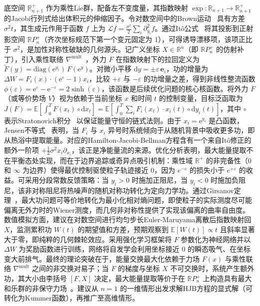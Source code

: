 ﻿\documentclass[10pt,a4paper]{article}
\begin{document}
\begin{framed}
  
底空间 $\mathbb R^+_{n+1}$ 作为乘性Lie群，配备左不变度量，其指数映射 $\exp: \mathbb R_{n+1} \to \mathbb R^+_{n+1}$ 的Jacobi行列式给出体积元的伸缩因子。令对数空间中的Brown运动~\cite{Nelson1967Dynamical} 具有方差 $\sigma^2 t$，其生成元作用于函数 $f$ 上为 $\mathcal L f = \frac{\sigma^2}{2} \sum_i \partial_{y_i}^2 f$。通过It\^o公式~\cite{ItO1951Stochastic,Protter2005Stochastic} 将其投影到正射影空间 $\mathbb R P^+_n$（齐次坐标规范下第一个变元固定为 $1$），可得诱导漂移项，该项正比于 $\sigma^2$，是加性对称性破缺的几何源头。记广义坐标 $X \in \mathbb R^n$（即 $\mathbb R P^+_n$ 的仿射补丁），引入乘性联络 $\nabla^{\mathrm{mult}}$~\cite{KobayashiNomizu1963Foundations}，外力 $F$ 在指数映射下的拉回定义为 $\tilde F(y) = \mathrm{diag}(\mathrm e^{y_i}) \, F(\mathrm e^y)$。对微小平移 $\mathrm dy = \pm\varepsilon \, \mathbf e_i$，功的增量为 $\Delta W = F_i(x) \cdot (\mathrm e^{\varepsilon} - 1) x_i$，比较 $+\varepsilon$ 与 $-\varepsilon$ 的功增量之差，得到非线性整流函数 $\phi(\varepsilon) = \mathrm e^{\varepsilon} - \mathrm e^{-\varepsilon} = 2\sinh(\varepsilon)$，该函数是后续优化问题的核心核函数。将外力 $F$（或等价势场 $V$）视为依赖于当前坐标 $x$ 和时间 $t$ 的控制变量，目标泛函取为 $J(F) = \mathbb E\left[\int_0^T F(x_t)\circ \mathrm dx_t\right] = \mathbb E\left[\int_0^T \sum_i F_i(x_t)\cdot x_i(t)\circ \mathrm dy_i(t)\right]$，其中 $\circ$ 表示Stratonovich积分~\cite{Stratonovich1966New} 以保证能量守恒的链式法则。由于 $x_i = \mathrm e^{y_i}$ 是凸函数，Jensen不等式~\cite{Jensen1906SurLesFonctions} 表明，当 $F_i$ 与 $x_i$ 异号时系统倾向于从随机背景中吸收更多功，即从热浴中提取能量。对应的Hamilton-Jacobi-Bellman方程含有一个来自It\^o修正的额外一阶项 $+\frac12\sigma^2 x_i \partial_{x_i}$，该正是净能量流的来源。优化分析表明，最大能量提取不在平衡态处实现，而在于边界追踪或奇异点吸引机制：乘性域 $\mathbb R^+$ 的非完备性（$0$ 和 $\infty$ 为边界）使得最优控制驱使粒子轨迹接近 $0$，因为 $e^{-\varepsilon}$ 的损失小于 $e^{+\varepsilon}$ 的收益。可采用分段常数反馈策略：当 $y_i > 0$ 时施加正阻尼，当 $y_i < 0$ 时施加负阻尼，该非对称阻尼将热噪声的随机对称功转化为定向力学功。通过Girsanov定理~\cite{Bismut1981LargeDeviations}，最大功问题可等价地转化为最小化相对熵问题，即使粒子的实际测度尽可能偏离无外力时的Wiener测度，而几何非对称性提供了实现该偏离的曲率自由度。数值模拟方面，建议在对数空间进行均匀步长Euler-Maruyama离散后指数映射回 $X$，监测累积功 $W(t)$ 的期望值和方差，预期观察到 $\mathbb E[W(t)] \propto t$ 且斜率显著大于零，即纯粹的几何棘轮效应。采用强化学习框架将 $F$ 参数化为神经网络并以 $\Delta W$ 为奖励函数进行训练，网络将自发学会利用坐标接近 $0$ 的瞬态吸气、在坐标变大前排气。最终的理论突破在于，能量交换最大化依赖于力场 $F(x)$ 与乘性联络 $\nabla^{\mathrm{mult}}$ 之间的非交换对易子；当 $F$ 的梯度与坐标 $X$ 不可交换时，系统产生额外功，其大小由李括号 $[F, X]$ 决定，最大能量提取等价于在 $\mathbb R P^+_n$ 上构造具有最大和乐群的非保守力场~\cite{KobayashiNomizu1963Foundations}。建议从 $n=1$ 的一维情形出发求解HJB方程的显式解（可转化为Kummer函数），再推广至高维情形。

\end{framed}
\end{document}
